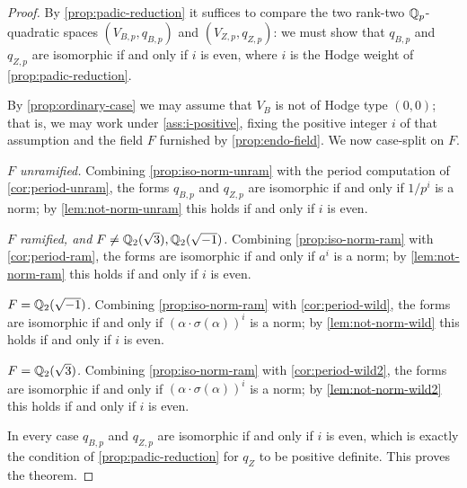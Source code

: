 \begin{proof}
  By \cref{prop:padic-reduction} it suffices to compare the two rank-two
  \(\mathbb{Q}_p\)-quadratic spaces \((V_{B,p}, q_{B,p})\) and \((V_{Z,p}, q_{Z,p})\):
  we must show that \(q_{B,p}\) and \(q_{Z,p}\) are isomorphic if and only if
  \(i\) is even, where \(i\) is the Hodge weight of \cref{prop:padic-reduction}.

  By \cref{prop:ordinary-case} we may assume that \(V_B\) is not of Hodge type
  \((0,0)\); that is, we may work under \cref{ass:i-positive}, fixing the
  positive integer \(i\) of that assumption and the field \(F\) furnished by
  \cref{prop:endo-field}. We now case-split on \(F\).

  \emph{\(F\) unramified.} Combining \cref{prop:iso-norm-unram} with the period
  computation of \cref{cor:period-unram}, the forms \(q_{B,p}\) and \(q_{Z,p}\)
  are isomorphic if and only if \(1/p^i\) is a norm; by
  \cref{lem:not-norm-unram} this holds if and only if \(i\) is even.

  \emph{\(F\) ramified, and \(F \neq \mathbb{Q}_2(\sqrt{3}), \mathbb{Q}_2(\sqrt{-1})\).}
  Combining \cref{prop:iso-norm-ram} with \cref{cor:period-ram}, the forms are
  isomorphic if and only if \(a^i\) is a norm; by \cref{lem:not-norm-ram} this
  holds if and only if \(i\) is even.

  \emph{\(F = \mathbb{Q}_2(\sqrt{-1})\).} Combining \cref{prop:iso-norm-ram} with
  \cref{cor:period-wild}, the forms are isomorphic if and only if
  \((\alpha \cdot \sigma(\alpha))^i\) is a norm; by \cref{lem:not-norm-wild}
  this holds if and only if \(i\) is even.

  \emph{\(F = \mathbb{Q}_2(\sqrt{3})\).} Combining \cref{prop:iso-norm-ram} with
  \cref{cor:period-wild2}, the forms are isomorphic if and only if
  \((\alpha \cdot \sigma(\alpha))^i\) is a norm; by \cref{lem:not-norm-wild2}
  this holds if and only if \(i\) is even.

  In every case \(q_{B,p}\) and \(q_{Z,p}\) are isomorphic if and only if \(i\)
  is even, which is exactly the condition of \cref{prop:padic-reduction} for
  \(q_Z\) to be positive definite. This proves the theorem.
\end{proof}

